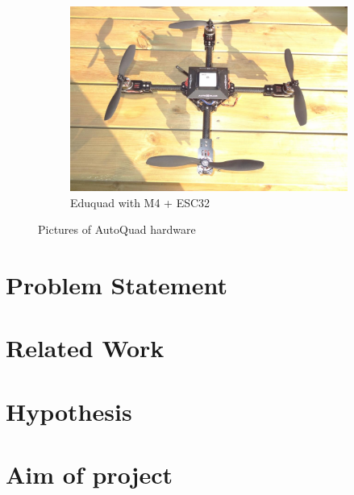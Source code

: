 \begin{figure}[H]
    \begin{subfigure}[b]{0.3\textwidth}
        \includegraphics[width=\textwidth]{graphics/eduquad.jpg}
        \caption{Eduquad with M4 + ESC32}
        \label{fig:mouse}
    \end{subfigure}
    \caption{Pictures of AutoQuad hardware}\label{fig:AQ_hw}
\end{figure} 



\newpage
\section{Problem Statement}

\section{Related Work}

\section{Hypothesis}

\section{Aim of project}


